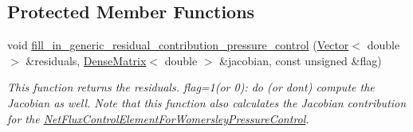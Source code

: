 \subsection*{Protected Member Functions}
\begin{DoxyCompactItemize}
\item 
void \hyperlink{classoomph_1_1NavierStokesWomersleyPressureControlElement_a615400a9e8489a2ea7e1b1722d98c95e}{fill\+\_\+in\+\_\+generic\+\_\+residual\+\_\+contribution\+\_\+pressure\+\_\+control} (\hyperlink{classoomph_1_1Vector}{Vector}$<$ double $>$ \&residuals, \hyperlink{classoomph_1_1DenseMatrix}{Dense\+Matrix}$<$ double $>$ \&jacobian, const unsigned \&flag)
\begin{DoxyCompactList}\small\item\em This function returns the residuals. flag=1(or 0)\+: do (or don\textquotesingle{}t) compute the Jacobian as well. Note that this function also calculates the Jacobian contribution for the \hyperlink{classoomph_1_1NetFluxControlElementForWomersleyPressureControl}{Net\+Flux\+Control\+Element\+For\+Womersley\+Pressure\+Control}. \end{DoxyCompactList}\end{DoxyCompactItemize}
